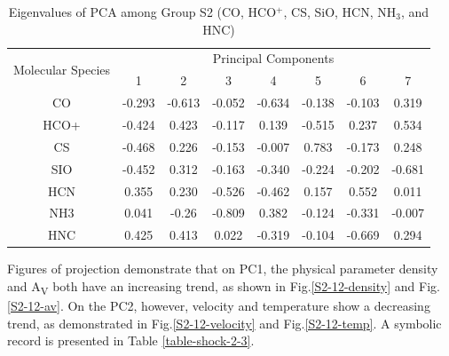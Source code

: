 \documentclass{aa}
\begin{document}
\begin{CJK*}{UTF8}{gbsn}
\begin{table}[htp]
\centering
\begin{tabular}{cccccccc}
\hline\hline
\multirow{2}{*}{Molecular Species} & \multicolumn{7}{c}{Principal Components}                 \\ \cline{2-8} 
                                   & 1       & 2       & 3       & 4       & 5      & 6    & 7\\ \hline
CO   & -0.293  & -0.613 & -0.052 & -0.634 & -0.138 & -0.103 & 0.319 \\ \hline
HCO+ & -0.424 & 0.423  & -0.117 & 0.139   & -0.515 & 0.237   & 0.534  \\ \hline
CS   & -0.468 & 0.226  & -0.153 & -0.007 & 0.783  & -0.173 & 0.248  \\ \hline
SIO  & -0.452  & 0.312   & -0.163 & -0.340 & -0.224 & -0.202 & -0.681 \\ \hline
HCN  & 0.355  & 0.230  & -0.526  & -0.462 & 0.157  & 0.552   & 0.011  \\ \hline
NH3  & 0.041  & -0.26 & -0.809 & 0.382  & -0.124 & -0.331 & -0.007  \\ \hline
HNC  & 0.425  & 0.413  & 0.022  & -0.319 & -0.104 & -0.669 & 0.294  \\ \hline\hline
\end{tabular}
\caption{Eigenvalues of PCA among Group S2 (CO, HCO$^+$, CS, SiO, HCN, NH$_3$, and HNC)}
\label{table-shock-2-eigen}
\end{table}

    Figures of projection demonstrate that on PC1, the physical parameter density and A\textsubscript{V} both have an increasing trend, as shown in Fig.\ref{S2-12-density} and Fig.\ref{S2-12-av}. 
    On the PC2, however, velocity and temperature show a decreasing trend, as demonstrated in Fig.\ref{S2-12-velocity} and Fig.\ref{S2-12-temp}. 
    A symbolic record is presented in Table \ref{table-shock-2-3}. 


\end{CJK*}
\end{document}
